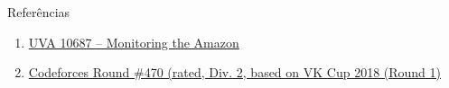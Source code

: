 \begin{frame}[fragile]{Referências}

    \begin{enumerate}
        \item \href{https://uva.onlinejudge.org/index.php?option=com_onlinejudge&Itemid=8&category=24&page=show_problem&problem=1628}{UVA 10687 -- Monitoring the Amazon}

        \item \href{https://codeforces.com/problemset/problem/948/A}{Codeforces Round \#470 (rated, Div. 2, based on VK Cup 2018 (Round 1)}
    \end{enumerate}

\end{frame}
